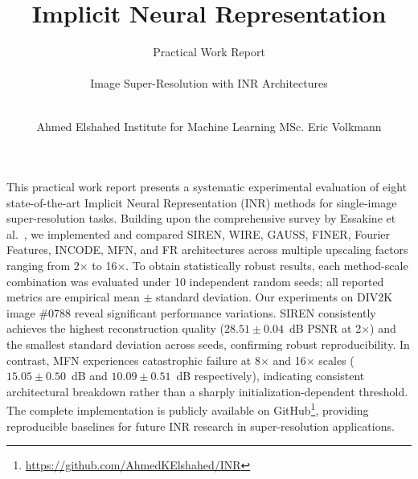 \documentclass[a4paper,oneside,10pt,ngerman,english]{scrartcl}
\begin{document}

\title{Implicit Neural Representation}

\subtitle{Practical Work Report\\%
    \hfill\\%
    Image Super-Resolution with INR Architectures\\
    \hfill\\%
}

\author{%
    \authornewline
    Ahmed Elshahed
    \authornewline
    \authornewline
    Institute for Machine Learning
    \authornewline
    \authornewline
    MSc. Eric Volkmann
}

\maketitle

\cleardoubleoddpage
\tableofcontents

\cleardoubleoddpage
{}

This practical work report presents a systematic experimental evaluation of eight state-of-the-art Implicit Neural Representation (INR) methods for single-image super-resolution tasks. Building upon the comprehensive survey by Essakine et al.~\cite{essakine2024survey}, we implemented and compared SIREN, WIRE, GAUSS, FINER, Fourier Features, INCODE, MFN, and FR architectures across multiple upscaling factors ranging from 2$\times$ to 16$\times$. To obtain statistically robust results, each method-scale combination was evaluated under 10 independent random seeds; all reported metrics are empirical mean $\pm$ standard deviation. Our experiments on DIV2K~\cite{agustsson2017div2k} image \#0788 reveal significant performance variations. SIREN consistently achieves the highest reconstruction quality ($28.51 \pm 0.04$~dB PSNR at 2$\times$) and the smallest standard deviation across seeds, confirming robust reproducibility. In contrast, MFN experiences catastrophic failure at 8$\times$ and 16$\times$ scales ($15.05 \pm 0.50$~dB and $10.09 \pm 0.51$~dB respectively), indicating consistent architectural breakdown rather than a sharply initialization-dependent threshold. The complete implementation is publicly available on GitHub\footnote{\url{https://github.com/AhmedKElshahed/INR}}, providing reproducible baselines for future INR research in super-resolution applications.
\end{document}
